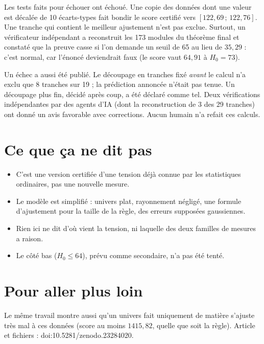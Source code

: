 Les tests faits pour échouer ont échoué. Une copie des données dont une valeur est décalée de 10 écarts-types fait
bondir le score certifié vers $[122{,}69\,;\,122{,}76]$. Une tranche qui contient le meilleur ajustement n'est pas
exclue. Surtout, un vérificateur indépendant a reconstruit les 173 modules du théorème final et constaté que la preuve
casse si l'on demande un seuil de 65 au lieu de $35{,}29$ : c'est normal, car l'énoncé deviendrait faux (le score vaut
$64{,}91$ à $H_0=73$).

Un échec a aussi été publié. Le découpage en tranches fixé \emph{avant} le calcul n'a exclu que 8 tranches sur 19 ;
la prédiction annoncée n'était pas tenue. Un découpage plus fin, décidé après coup, a été déclaré comme tel. Deux
vérifications indépendantes par des agents d'IA (dont la reconstruction de 3 des 29 tranches) ont donné un avis
favorable avec corrections. Aucun humain n'a refait ces calculs.

\section*{Ce que ça ne dit pas}

\begin{limite}
\begin{itemize}
\item C'est une version certifiée d'une tension déjà connue par les statistiques ordinaires, pas une nouvelle mesure.
\item Le modèle est simplifié : univers plat, rayonnement négligé, une formule d'ajustement pour la taille de la
règle, des erreurs supposées gaussiennes.
\item Rien ici ne dit d'où vient la tension, ni laquelle des deux familles de mesures a raison.
\item Le côté bas ($H_0\le64$), prévu comme secondaire, n'a pas été tenté.
\end{itemize}
\end{limite}

\section*{Pour aller plus loin}

Le même travail montre aussi qu'un univers fait uniquement de matière s'ajuste très mal à ces données (score au moins
$1415{,}82$, quelle que soit la règle). Article et fichiers : doi:10.5281/zenodo.23284020.
